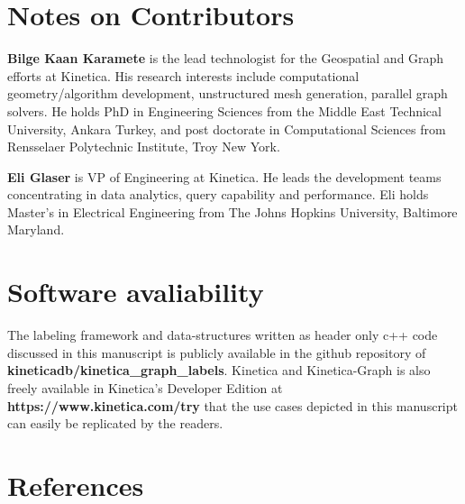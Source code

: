 \documentclass[preprint,3p,twocolumn]{elsarticle}
\begin{document}
\section*{Notes on Contributors}
\small{
\noindent \textbf{Bilge Kaan Karamete} is the lead technologist for the Geospatial and Graph efforts at Kinetica. His research interests include computational geometry/algorithm development, unstructured mesh generation, parallel graph solvers. He holds PhD in Engineering Sciences from the Middle East Technical University, Ankara Turkey, and post doctorate in Computational Sciences from Rensselaer Polytechnic Institute, Troy New York.

\noindent \textbf{Eli Glaser} is VP of Engineering at Kinetica. He leads the development teams concentrating in data analytics, query capability and performance. Eli holds Master's in Electrical Engineering from The Johns Hopkins University, Baltimore Maryland.
}


\section{Software avaliability}

The labeling framework and data-structures written as header only c++ code discussed in this manuscript is publicly available in the github repository of \textbf{kineticadb/kinetica\_graph\_labels}. Kinetica and Kinetica-Graph is also freely available in Kinetica's Developer Edition at \textbf{https://www.kinetica.com/try} that the use cases depicted in this manuscript can easily be replicated by the readers.

\section*{References}


\end{document}
